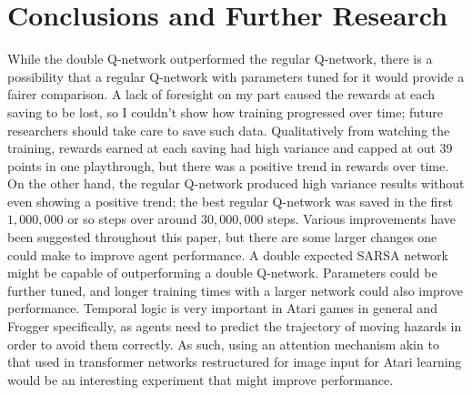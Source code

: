 \documentclass{homework}
\begin{document}
\section{Conclusions and Further Research}
While the double Q-network outperformed the regular Q-network, there is a possibility that a regular Q-network with parameters tuned for it would provide a fairer comparison. A lack of foresight on my part caused the rewards at each saving to be lost, so I couldn't show how training progressed over time; future researchers should take care to save such data. Qualitatively from watching the training, rewards earned at each saving had high variance and capped at out 39 points in one playthrough, but there was a positive trend in rewards over time. On the other hand, the regular Q-network produced high variance results without even showing a positive trend; the best regular Q-network was saved in the first $1,000,000$ or so steps over around $30,000,000$ steps. Various improvements have been suggested throughout this paper, but there are some larger changes one could make to improve agent performance. A double expected SARSA network might be capable of outperforming a double Q-network. Parameters could be further tuned, and longer training times with a larger network could also improve performance. Temporal logic is very important in Atari games in general and Frogger specifically, as agents need to predict the trajectory of moving hazards in order to avoid them correctly. As such, using an attention mechanism akin to that used in transformer networks restructured for image input for Atari learning would be an interesting experiment that might improve performance.
\newpage
\printbibliography
\end{document}
